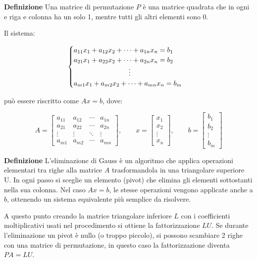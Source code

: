 \documentclass{article}
\newcommand{\df}{\noindent\textbf{Definizione} }
\begin{document}
\df Una matrice di permutazione \(P\) è una matrice quadrata che in ogni e riga e colonna ha un solo 1, mentre tutti gli altri elementi sono 0.\newline

Il sistema:

\[
\begin{cases}
a_{11}x_1+a_{12}x_2+\cdots+a_{1n}x_n=b_1\\
a_{21}x_1+a_{22}x_2+\cdots+a_{2n}x_n=b_2\\
\hspace{2.8cm}\vdots\\
a_{m1}x_1+a_{m2}x_2+\cdots+a_{mn}x_n=b_m
\end{cases}
\]

può essere riscritto come $Ax=b$, dove:

\[
A=
\begin{bmatrix}
a_{11} & a_{12} & \cdots & a_{1n}\\
a_{21} & a_{22} & \cdots & a_{2n}\\
\vdots & \vdots & \ddots & \vdots\\
a_{m1} & a_{m2} & \cdots & a_{mn}
\end{bmatrix},
\qquad
x=
\begin{bmatrix}
x_1\\
x_2\\
\vdots\\
x_n
\end{bmatrix},
\qquad
b=
\begin{bmatrix}
b_1\\
b_2\\
\vdots\\
b_m
\end{bmatrix}
\]\newline

\df L'eliminazione di Gauss è un algoritmo che applica operazioni elementari tra righe alla matrice $A$ trasformandola in una triangolare superiore U. In ogni passo si sceglie un elemento (pivot) che elimina gli elementi sottostanti nella sua colonna. Nel caso $Ax=b$, le stesse operazioni vengono applicate anche a $b$, ottenendo un sistema equivalente più semplice da risolvere.\newline

A questo punto creando la matrice triangolare inferiore $L$ con i coefficienti moltiplicativi usati nel procedimento si ottiene la fattorizzazione $LU$. Se durante l'eliminazione un pivot è nullo (o troppo piccolo), si possono scambiare 2 righe con una matrice di permutazione, in questo caso la fattorizzazione diventa $PA=LU$.\newline
\end{document}
